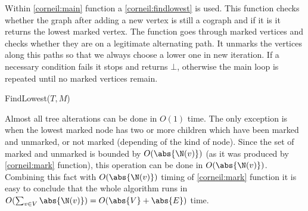 Within \ref{corneil:main} function a \ref{corneil:findlowest} is used. This function checks whether the graph after adding a new vertex is still a cograph and if it is it returns the lowest marked vertex. The function goes through marked vertices and checks whether they are on a legitimate alternating path. It unmarks the vertices along this paths so that we always choose a lower one in new iteration. If a necessary condition fails it stops and returns $\bot$, otherwise the main loop is repeated until no marked vertices remain.

\begin{function}
    \caption{FindLowest($T, M$)}
    \label{corneil:findlowest}
    \DontPrintSemicolon

\end{function}

Almost all tree alterations can be done in $O(1)$ time. The only exception is when the lowest marked node has two or more children which have been marked and unmarked, or not marked (depending of the kind of node). Since the set of marked and unmarked is bounded by $O(\abs{\N(v)})$ (as it was produced by \ref{corneil:mark} function), this operation can be done in $O(\abs{\N(v)})$.
Combining this fact with $O(\abs{\N(v)})$ timing of \ref{corneil:mark} function it is easy to conclude that the whole algorithm runs in $O(\sum_{v \in V} \abs{\N(v)}) = O(\abs{V} + \abs{E})$ time.
